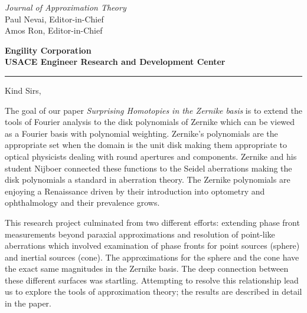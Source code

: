 \documentclass[]{letter} %
\begin{document}
\longindentation=0pt                       %
\let\raggedleft\raggedright                %
 
\begin{letter}{\emph{Journal of Approximation Theory} \\
Paul Nevai, Editor-in-Chief\\Amos Ron, Editor-in-Chief}

\begin{flushleft}
{\large\bf Engility Corporation\\}
{\large\bf USACE Engineer Research and Development Center}
\end{flushleft}
\medskip\hrule height 1pt
\vfill %

 
\opening{Kind Sirs,} %
 
\noindent The goal of our paper \emph{Surprising Homotopies in the Zernike basis} is to extend the tools of Fourier analysis to the disk polynomials of Zernike which can be viewed as a Fourier basis with polynomial weighting. Zernike's polynomials are the appropriate set when the domain is the unit disk making them appropriate to optical physicists dealing with round apertures and components. Zernike and his student Nijboer connected these functions to the Seidel aberrations making the disk polynomials a standard in aberration theory. The Zernike polynomials are enjoying a Renaissance driven by their introduction into optometry and ophthalmology and their prevalence grows.

\noindent This research project culminated from two different efforts: extending phase front measurements beyond paraxial approximations and resolution of point-like aberrations which involved examination of phase fronts for point sources (sphere) and inertial sources (cone). The approximations for the sphere and the cone have the exact same magnitudes in the Zernike basis.
The deep connection between these different surfaces was startling. Attempting to resolve this relationship lead us to explore the tools of approximation theory; the results are described in detail in the paper.


\end{letter}
\end{document}
